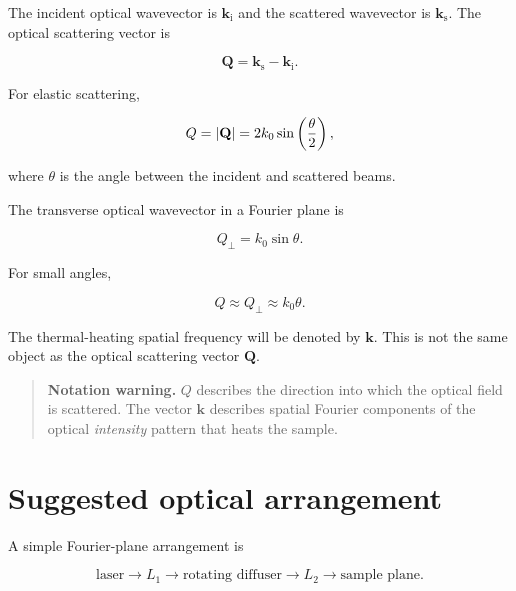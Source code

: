 \documentclass[11pt]{article}
\newcommand{\kopt}{k_0}
\newcommand{\kvec}{\mathbf{k}}
\newcommand{\qvec}{\mathbf{Q}}
\begin{document}
The incident optical wavevector is $\mathbf{k}_{\mathrm{i}}$ and the scattered
wavevector is $\mathbf{k}_{\mathrm{s}}$. The optical scattering vector is

\begin{equation}
    \qvec = \mathbf{k}_{\mathrm{s}}-\mathbf{k}_{\mathrm{i}}.
\end{equation}

For elastic scattering,

\begin{equation}
    Q = \abs{\qvec}
      = 2\kopt\sin\left(\frac{\theta}{2}\right),
    \label{eq:Q_full}
\end{equation}

where $\theta$ is the angle between the incident and scattered beams.

The transverse optical wavevector in a Fourier plane is

\begin{equation}
    Q_\perp = \kopt\sin\theta.
    \label{eq:Qtransverse}
\end{equation}

For small angles,

\begin{equation}
    Q \approx Q_\perp \approx \kopt\theta.
\end{equation}

The thermal-heating spatial frequency will be denoted by $\kvec$. This is not
the same object as the optical scattering vector $\qvec$.

\begin{quote}
\textbf{Notation warning.}
$Q$ describes the direction into which the optical field is scattered.
The vector $\kvec$ describes spatial Fourier components of the optical
\emph{intensity} pattern that heats the sample.
\end{quote}

\section{Suggested optical arrangement}

A simple Fourier-plane arrangement is

\begin{equation}
\text{laser}
\rightarrow
L_1
\rightarrow
\text{rotating diffuser}
\rightarrow
L_2
\rightarrow
\text{sample plane}.
\end{equation}
\end{document}
